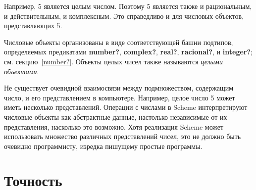 Например, 5 является целым числом. Поэтому 5 является также и рациональным, и действительным, и
комплексным. Это справедливо и для числовых объектов, представляющих 5.

Числовые объекты организованы в виде соответствующей башни подтипов, определяемых предикатами
{\cf\bfseries number?}, {\cf\bfseries complex?}, {\cf\bfseries real?}, {\cf\bfseries racional?},
и {\cf\bfseries integer?}; см. секцию~\ref{number?}. Объекты целых чисел также
называются \textit{целыми объектами}.

Не существует очевидной взаимосвязи между подмножеством, содержащим число, и его представлением
в компьютере. Например, целое число 5 может иметь несколько представлений. Операции с числами в
Scheme интерпретируют числовые объекты как абстрактные данные, настолько независимые от их
представления, насколько это возможно. Хотя реализация Scheme может использовать множество
различных представлений чисел, это не должно быть очевидно программисту, изредка пишущему
простые программы.

\section{Точность}
\label{exactly}

